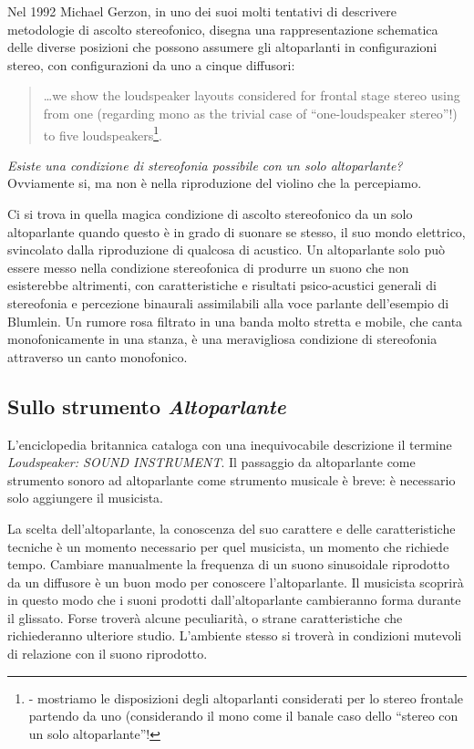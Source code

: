 Nel 1992 Michael Gerzon, in uno dei suoi molti tentativi di descrivere
metodologie di ascolto stereofonico, disegna una rappresentazione schematica
delle diverse posizioni che possono assumere gli altoparlanti in
configurazioni stereo, con configurazioni da uno a cinque diffusori:

\begin{quote}
\ldots we show the loudspeaker layouts considered for frontal stage stereo
using from one (regarding mono as the trivial case of “one-loudspeaker stereo”!)
to five loudspeakers\footnote{\cite{mg92pdmsss} - mostriamo le disposizioni
degli altoparlanti considerati per lo stereo frontale partendo da uno
(considerando il mono come il banale caso dello “stereo con un solo altoparlante”!}.
\end{quote}

\emph{Esiste una condizione di stereofonia possibile con un solo altoparlante?}
Ovviamente si, ma non è nella riproduzione del violino che la percepiamo.

Ci si trova in quella magica condizione di ascolto stereofonico da un solo altoparlante
quando questo è in grado di suonare se stesso, il suo mondo elettrico, svincolato
dalla riproduzione di qualcosa di acustico. Un altoparlante solo può essere
messo nella condizione stereofonica di produrre un suono che non esisterebbe
altrimenti, con caratteristiche e risultati psico-acustici generali di stereofonia
e percezione binaurali assimilabili alla voce parlante dell'esempio di Blumlein.
Un rumore rosa filtrato in una banda molto stretta e mobile, che canta
monofonicamente in una stanza, è una meravigliosa condizione di stereofonia
attraverso un canto monofonico.

\subsection{Sullo strumento \emph{Altoparlante}}

L'enciclopedia britannica cataloga con una inequivocabile descrizione il termine
\emph{Loudspeaker: SOUND INSTRUMENT}. Il passaggio da altoparlante come strumento
sonoro ad altoparlante come strumento musicale è breve: è necessario solo
aggiungere il musicista.

La scelta dell'altoparlante, la conoscenza del suo carattere e delle caratteristiche
tecniche è un momento necessario per quel musicista, un momento che richiede tempo.
Cambiare manualmente la frequenza di un suono sinusoidale riprodotto da un diffusore è un
buon modo per conoscere l'altoparlante. Il musicista scoprirà in questo modo che i
suoni prodotti dall'altoparlante cambieranno forma durante il glissato. Forse
troverà alcune peculiarità, o strane caratteristiche che richiederanno ulteriore
studio. L'ambiente stesso si troverà in condizioni mutevoli di relazione con il suono riprodotto.


